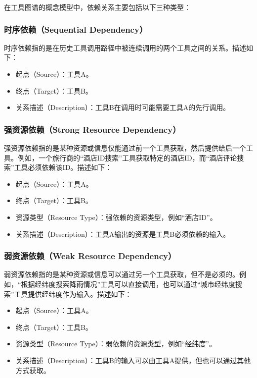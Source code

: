 在工具图谱的概念模型中，依赖关系主要包括以下三种类型：

\subsubsection{时序依赖（Sequential Dependency）}
时序依赖指的是在历史工具调用路径中被连续调用的两个工具之间的关系。描述如下：
\begin{itemize}
    \item 起点（Source）：工具A。
    \item 终点（Target）：工具B。
    \item 关系描述（Description）：工具B在调用时可能需要工具A的先行调用。
\end{itemize}

\subsubsection{强资源依赖（Strong Resource Dependency）}
强资源依赖指的是某种资源或信息仅能通过前一个工具获取，然后提供给后一个工具。例如，一个旅行商的“酒店ID搜索”工具获取特定的酒店ID，而“酒店评论搜索”工具必须依赖该ID。描述如下：
\begin{itemize}
    \item 起点（Source）：工具A。
    \item 终点（Target）：工具B。
    \item 资源类型（Resource Type）：强依赖的资源类型，例如``酒店ID''。
    \item 关系描述（Description）：工具A输出的资源是工具B必须依赖的输入。
\end{itemize}

\subsubsection{弱资源依赖（Weak Resource Dependency）}
弱资源依赖指的是某种资源或信息可以通过另一个工具获取，但不是必须的。例如，“根据经纬度搜索降雨情况”工具可以直接调用，也可以通过“城市经纬度搜索”工具提供经纬度作为输入。描述如下：
\begin{itemize}
    \item 起点（Source）：工具A。
    \item 终点（Target）：工具B。
    \item 资源类型（Resource Type）：弱依赖的资源类型，例如``经纬度''。
    \item 关系描述（Description）：工具B的输入可以由工具A提供，但也可以通过其他方式获取。
\end{itemize}

